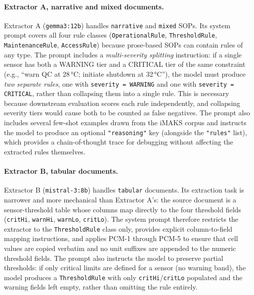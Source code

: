 ﻿\documentclass[11pt]{article}
\begin{document}
\paragraph{Extractor A, narrative and mixed documents.}
Extractor A (\texttt{gemma3:12b}) handles \texttt{narrative} and \texttt{mixed}
SOPs.  Its system prompt covers all four rule classes
(\texttt{OperationalRule}, \texttt{ThresholdRule}, \texttt{MaintenanceRule},
\texttt{AccessRule}) because prose-based SOPs can contain rules of any type.
The prompt includes a \emph{multi-severity splitting} instruction: if a single
sensor has both a WARNING tier and a CRITICAL tier of the same constraint
(e.g., ``warn QC at 28\,°C; initiate shutdown at 32\,°C''), the model must
produce \emph{two separate rules}, one with \texttt{severity = WARNING} and one
with \texttt{severity = CRITICAL}, rather than collapsing them into a single rule.
This is necessary because downstream evaluation scores each rule independently,
and collapsing severity tiers would cause both to be counted as false negatives.
The prompt also includes several few-shot examples drawn from the iMAKS corpus
and instructs the model to produce an optional \texttt{"reasoning"} key (alongside
the \texttt{"rules"} list), which provides a chain-of-thought trace for
debugging without affecting the extracted rules themselves.

\paragraph{Extractor B, tabular documents.}
Extractor B (\texttt{mistral-3:8b}) handles \texttt{tabular} documents.
Its extraction task is narrower and more mechanical than Extractor A's: the
source document is a sensor-threshold table whose columns map directly to the
four threshold fields (\texttt{critHi}, \texttt{warnHi}, \texttt{warnLo},
\texttt{critLo}).  The system prompt therefore restricts the extractor to the
\texttt{ThresholdRule} class only, provides explicit column-to-field mapping
instructions, and applies PCM-1 through PCM-5 to ensure that cell values are
copied verbatim and no unit suffixes are appended to the numeric threshold fields.
The prompt also instructs the model to preserve partial thresholds: if only
critical limits are defined for a sensor (no warning band), the model produces a
\texttt{ThresholdRule} with only \texttt{critHi}/\texttt{critLo} populated and
the warning fields left empty, rather than omitting the rule entirely.
\end{document}
